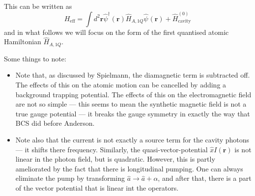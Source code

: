 \documentclass[twocolumn]{revtex4-1}
\renewcommand{\vec}[1]{\mathbf{#1}}
\begin{document}
This can be written as
\begin{equation}
  \label{eq:18}
  H_{\text{eff}} 
  =
  \int d^2\vec{r} 
  \hat{\psi}^\dagger(\vec{r})
  \hat{H}_{A,1Q}
  \hat{\psi}^{}(\vec{r})
  + \hat{H}^{(0)}_{\text{cavity}}
\end{equation}
and in what follows we will focus on the form of the first quantised
atomic Hamiltonian $\hat{H}_{A,1Q}$.



Some things to note:
\begin{itemize}
\item Note that, as discussed by Spielmann, the diamagnetic term is
  subtracted off.  The effects of this on the atomic motion can be
  cancelled by adding a background trapping potential.  The effects of
  this on the electromagnetic field are not so simple --- this seems
  to mean the synthetic magnetic field is not a true gauge potential
  --- it breaks the gauge symmetry in exactly the way that BCS did
  before Anderson.
\item Note also that the current is not exactly a source term for the
  cavity photons --- it shifts there frequency. Similarly, the
  quasi-vector-potential $\hat{x} I(\vec{r})$ is not linear in the
  photon field, but is quadratic. However, this is partly ameliorated
  by the fact that there is longitudinal pumping.  One can always
  eliminate the pump by transforming $\hat{a} \to \hat{a} + \alpha$,
  and after that, there is a part of the vector potential that is
  linear int the operators.
\end{itemize}
\end{document}
